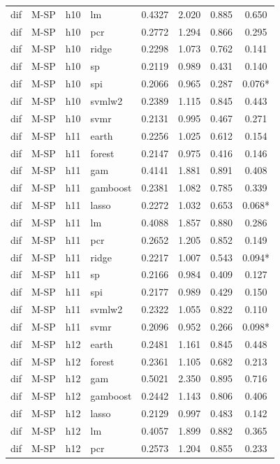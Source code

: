 \begin{ThreePartTable}
\begin{longtable}[t]{llclcccc}
dif & M-SP & h10 & lm & 0.4327 & 2.020 & 0.885 & 0.650\\
dif & M-SP & h10 & pcr & 0.2772 & 1.294 & 0.866 & 0.295\\
dif & M-SP & h10 & ridge & 0.2298 & 1.073 & 0.762 & 0.141\\
dif & M-SP & h10 & sp & 0.2119 & 0.989 & 0.431 & 0.140\\
dif & M-SP & h10 & spi & 0.2066 & 0.965 & 0.287 & 0.076*\\
dif & M-SP & h10 & svmlw2 & 0.2389 & 1.115 & 0.845 & 0.443\\
dif & M-SP & h10 & svmr & 0.2131 & 0.995 & 0.467 & 0.271\\
\addlinespace
dif & M-SP & h11 & earth & 0.2256 & 1.025 & 0.612 & 0.154\\
dif & M-SP & h11 & forest & 0.2147 & 0.975 & 0.416 & 0.146\\
dif & M-SP & h11 & gam & 0.4141 & 1.881 & 0.891 & 0.408\\
dif & M-SP & h11 & gamboost & 0.2381 & 1.082 & 0.785 & 0.339\\
dif & M-SP & h11 & lasso & 0.2272 & 1.032 & 0.653 & 0.068*\\
dif & M-SP & h11 & lm & 0.4088 & 1.857 & 0.880 & 0.286\\
dif & M-SP & h11 & pcr & 0.2652 & 1.205 & 0.852 & 0.149\\
dif & M-SP & h11 & ridge & 0.2217 & 1.007 & 0.543 & 0.094*\\
dif & M-SP & h11 & sp & 0.2166 & 0.984 & 0.409 & 0.127\\
dif & M-SP & h11 & spi & 0.2177 & 0.989 & 0.429 & 0.150\\
dif & M-SP & h11 & svmlw2 & 0.2322 & 1.055 & 0.822 & 0.110\\
dif & M-SP & h11 & svmr & 0.2096 & 0.952 & 0.266 & 0.098*\\
\addlinespace
dif & M-SP & h12 & earth & 0.2481 & 1.161 & 0.845 & 0.448\\
dif & M-SP & h12 & forest & 0.2361 & 1.105 & 0.682 & 0.213\\
dif & M-SP & h12 & gam & 0.5021 & 2.350 & 0.895 & 0.716\\
dif & M-SP & h12 & gamboost & 0.2442 & 1.143 & 0.806 & 0.406\\
dif & M-SP & h12 & lasso & 0.2129 & 0.997 & 0.483 & 0.142\\
dif & M-SP & h12 & lm & 0.4057 & 1.899 & 0.882 & 0.365\\
dif & M-SP & h12 & pcr & 0.2573 & 1.204 & 0.855 & 0.233\\

\end{longtable}
\end{ThreePartTable}
